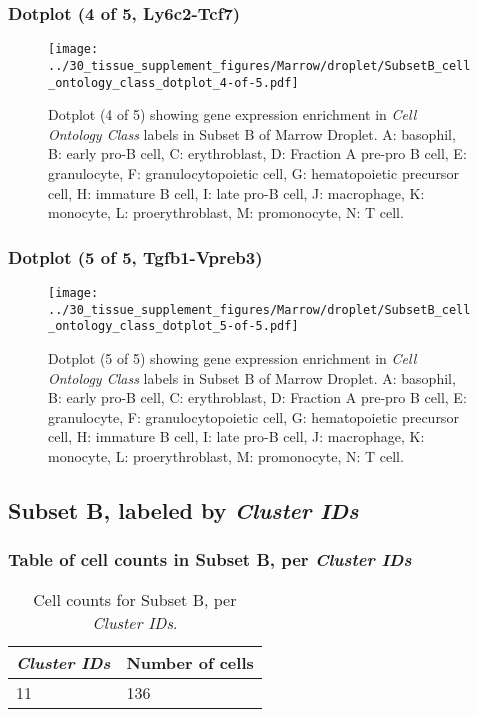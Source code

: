 \clearpage

\subsubsection{Dotplot (4 of 5, Ly6c2-Tcf7)}
\begin{figure}[h]
\centering
\texttt{[image: ../30\_tissue\_supplement\_figures/Marrow/droplet/SubsetB\_cell\_ontology\_class\_dotplot\_4-of-5.pdf]}

\caption{ Dotplot (4 of 5)  showing gene expression enrichment in \emph{Cell Ontology Class} labels in Subset B of Marrow Droplet. A: basophil, B: early pro-B cell, C: erythroblast, D: Fraction A pre-pro B cell, E: granulocyte, F: granulocytopoietic cell, G: hematopoietic precursor cell, H: immature B cell, I: late pro-B cell, J: macrophage, K: monocyte, L: proerythroblast, M: promonocyte, N: T cell.}
\end{figure}


\clearpage

\subsubsection{Dotplot (5 of 5, Tgfb1-Vpreb3)}
\begin{figure}[h]
\centering
\texttt{[image: ../30\_tissue\_supplement\_figures/Marrow/droplet/SubsetB\_cell\_ontology\_class\_dotplot\_5-of-5.pdf]}

\caption{ Dotplot (5 of 5)  showing gene expression enrichment in \emph{Cell Ontology Class} labels in Subset B of Marrow Droplet. A: basophil, B: early pro-B cell, C: erythroblast, D: Fraction A pre-pro B cell, E: granulocyte, F: granulocytopoietic cell, G: hematopoietic precursor cell, H: immature B cell, I: late pro-B cell, J: macrophage, K: monocyte, L: proerythroblast, M: promonocyte, N: T cell.}
\end{figure}


\clearpage

\subsection{Subset B, labeled by \emph{Cluster IDs}}
\subsubsection{Table of cell counts in Subset B, per \emph{Cluster IDs}}\begin{table}[h]
\centering
\label{my-label}
\begin{tabular}{@{}ll@{}}
\toprule

\emph{Cluster IDs}& Number of cells \\ \midrule
11 & 136 \\
\bottomrule
\end{tabular}
\caption{Cell counts for Subset B, per \emph{Cluster IDs}.}
\end{table}

